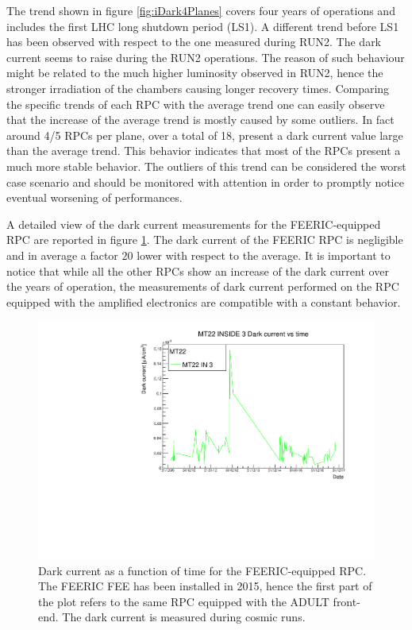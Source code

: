 The trend shown in figure \ref{fig:iDark4Planes} covers four years of operations and includes the first LHC long shutdown period (LS1).
A different trend before LS1 has been observed with respect to the one measured during RUN2.
The dark current seems to raise during the RUN2 operations.
The reason of such behaviour might be related to the much higher luminosity observed in RUN2, hence the stronger irradiation of the chambers causing longer recovery times.
Comparing the specific trends of each RPC with the average trend one can easily observe that the increase of the average trend is mostly caused by some outliers.
In fact around 4/5 RPCs per plane, over a total of 18, present a dark current value large than the average trend.
This behavior indicates that most of the RPCs present a much more stable behavior.
The outliers of this trend can be considered the worst case scenario and should be monitored with attention in order to promptly notice eventual worsening of performances.

A detailed view of the dark current measurements for the FEERIC-equipped RPC are reported in figure \ref{fig:FEERICiDark}.
The dark current of the FEERIC RPC is negligible and in average a factor $20$ lower with respect to the average.
It is important to notice that while all the other RPCs show an increase of the dark current over the years of operation, the measurements of dark current performed on the RPC equipped with the amplified electronics are compatible with a constant behavior.

\begin{figure}[!t]
\begin{center}
\includegraphics[width=0.95\linewidth]{Chapters/Performance/Figs/iDarkFEERIC.pdf}
\caption{Dark current as a function of time for the FEERIC-equipped RPC. The FEERIC FEE has been installed in 2015, hence the first part of the plot refers to the same RPC equipped with the ADULT front-end. The dark current is measured during cosmic runs.}
\label{fig:FEERICiDark}
\end{center}
\end{figure}

